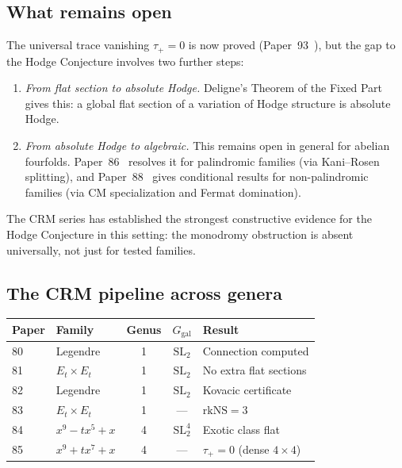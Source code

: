 \documentclass[11pt]{article}
\theoremstyle{plain}
\theoremstyle{definition}
\theoremstyle{remark}
\newcommand{\SL}{\mathrm{SL}}
\newcommand{\rk}{\mathrm{rk}}
\newcommand{\Ggal}{G_{\mathrm{gal}}}
\newcommand{\NS}{\mathrm{NS}}
\begin{document}
\subsection{What remains open}

The universal trace vanishing $\tau_+ = 0$ is now proved
(Paper~93~\cite{Lee2026p93}), but the gap to the Hodge Conjecture
involves two further steps:
\begin{enumerate}[nosep]
\item \emph{From flat section to absolute Hodge.} Deligne's Theorem
  of the Fixed Part~\cite{Deligne1971} gives this: a global flat
  section of a variation of Hodge structure is absolute Hodge.
\item \emph{From absolute Hodge to algebraic.} This remains open
  in general for abelian fourfolds.  Paper~86~\cite{Lee2026p86}
  resolves it for palindromic families (via Kani--Rosen splitting),
  and Paper~88~\cite{Lee2026p88} gives conditional results for
  non-palindromic families (via CM specialization and Fermat
  domination).
\end{enumerate}

The CRM series has established the strongest constructive evidence
for the Hodge Conjecture in this setting: the monodromy obstruction
is absent universally, not just for tested families.

\subsection{The CRM pipeline across genera}

\begin{center}
\begin{tabular}{llccl}
\toprule
Paper & Family & Genus & $\Ggal$ & Result \\
\midrule
80 & Legendre & 1 & $\SL_2$ & Connection computed \\
81 & $E_t \times E_t$ & 1 & $\SL_2$ & No extra flat sections \\
82 & Legendre & 1 & $\SL_2$ & Kovacic certificate \\
83 & $E_t \times E_t$ & 1 & --- & $\rk \NS = 3$ \\
84 & $x^9 - tx^5 + x$ & 4 & $\SL_2^4$ & Exotic class flat \\
85 & $x^9 + tx^7 + x$ & 4 & --- & $\tau_+ = 0$ (dense $4 \times 4$) \\
\bottomrule
\end{tabular}
\end{center}
\end{document}
